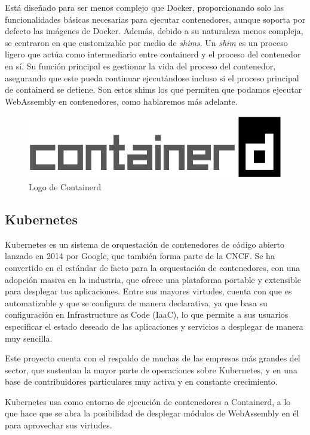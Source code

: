 Está diseñado para ser menos complejo que Docker, proporcionando solo las funcionalidades básicas necesarias para ejecutar contenedores, aunque soporta por defecto las imágenes de Docker. Además, debido a su naturaleza menos compleja, se centraron en que customizable por medio de \textit{shims}. Un \textit{shim} es un proceso ligero que actúa como intermediario entre containerd y el proceso del contenedor en sí. Su función principal es gestionar la vida del proceso del contenedor, asegurando que este pueda continuar ejecutándose incluso si el proceso principal de containerd se detiene. Son estos shims los que permiten que podamos ejecutar WebAssembly en contenedores, como hablaremos más adelante.

\begin{figure}[h!]
    \centering
    \includegraphics[width=0.5\linewidth]{figures/containerd-horizontal-color.png}
    \caption{Logo de Containerd}
    \label{fig:Containerd-Logo}
\end{figure}

\subsection{Kubernetes}

Kubernetes es un sistema de orquestación de contenedores de código abierto lanzado en 2014 por Google, que también forma parte de la CNCF. Se ha convertido en el estándar de facto para la orquestación de contenedores, con una adopción masiva en la industria, que ofrece una plataforma portable y extensible para desplegar tus aplicaciones. Entre sus mayores virtudes, cuenta con que es automatizable y que se configura de manera declarativa, ya que basa su configuración en Infrastructure as Code (IaaC), lo que permite a sus usuarios especificar el estado deseado de las aplicaciones y servicios a desplegar de manera muy sencilla.

Este proyecto cuenta con el respaldo de muchas de las empresas más grandes del sector, que sustentan la mayor parte de operaciones sobre Kubernetes, y en una base de contribuidores particulares muy activa y en constante crecimiento.

Kubernetes usa como entorno de ejecución de contenedores a Containerd, a lo que hace que se abra la posibilidad de desplegar módulos de WebAssembly en él para aprovechar sus virtudes.

